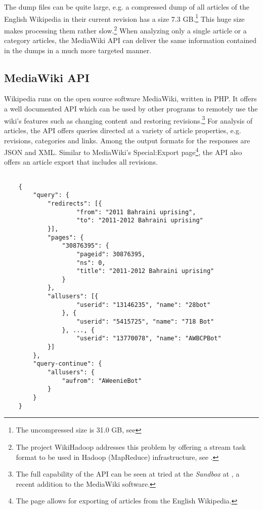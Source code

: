 The dump files can be quite large, e.g. a compressed dump of all articles of the English Wikipedia in their current revision has a size 7.3 GB.\footnote{The uncompressed size is 31.0 GB, see }
This huge size makes processing them rather slow.\footnote{The project WikiHadoop addresses this problem by offering a stream task format to be used in Hadoop (MapReduce) infrastructure, see .}
When analyzing only a single article or a category articles, the MediaWiki \ac{API} can deliver the same information contained in the dumps in a much more targeted manner. 

\subsection{MediaWiki \ac{API}}\label{sub:mediawikiapi}

Wikipedia runs on the open source software MediaWiki, written in \ac{PHP}.
It offers a well documented \ac{API} which can be used by other programs to remotely use the wiki's features such as changing content and restoring revisions.\footnote{The full capability of the \ac{API} can be seen at tried at the \emph{Sandbox} at , a recent addition to the MediaWiki software.}
For analysis of articles, the \ac{API} offers queries directed at a variety of article properties, e.g. revisions, categories and links.
Among the output formats for the responses are \ac{JSON} and \ac{XML}.
Similar to MediaWiki's Special:Export page\footnote{The page  allows for exporting of articles from the English Wikipedia.}, the \ac{API} also offers an article export that includes all revisions.
\begin{lstlisting}

	{
		"query": {
			"redirects": [{
					"from": "2011 Bahraini uprising",
					"to": "2011-2012 Bahraini uprising"
			}],
			"pages": {
				"30876395": {
					"pageid": 30876395,
					"ns": 0,
					"title": "2011-2012 Bahraini uprising"
				}
			},
			"allusers": [{
					"userid": "13146235", "name": "28bot"
				}, {
					"userid": "5415725", "name": "718 Bot"
				}, ..., {
					"userid": "13770078", "name": "AWBCPBot"
			}]
		},
		"query-continue": {
			"allusers": {
				"aufrom": "AWeenieBot"
			}
		}
	}
\end{lstlisting}

